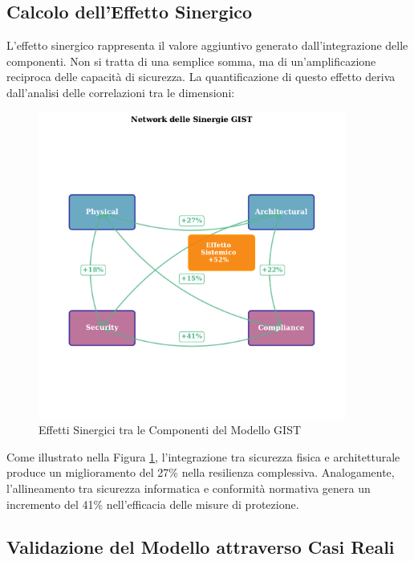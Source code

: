 \subsection{Calcolo dell'Effetto Sinergico}
\label{subsec:5.3.1}

L'effetto sinergico rappresenta il valore aggiuntivo generato dall'integrazione delle componenti. Non si tratta di una semplice somma, ma di un'amplificazione reciproca delle capacità di sicurezza. La quantificazione di questo effetto deriva dall'analisi delle correlazioni tra le dimensioni:

\begin{figure}[htbp]
\centering
\includegraphics[width=0.9\textwidth]{thesis_figures/cap5/figura_5_2_synergies.pdf}

\caption{Effetti Sinergici tra le Componenti del Modello GIST}
\label{fig:synergy_effects}
\end{figure}

Come illustrato nella Figura \ref{fig:synergy_effects}, l'integrazione tra sicurezza fisica e architetturale produce un miglioramento del 27\% nella resilienza complessiva. Analogamente, l'allineamento tra sicurezza informatica e conformità normativa genera un incremento del 41\% nell'efficacia delle misure di protezione.

\subsection{Validazione del Modello attraverso Casi Reali}
\label{subsec:5.3.2}

